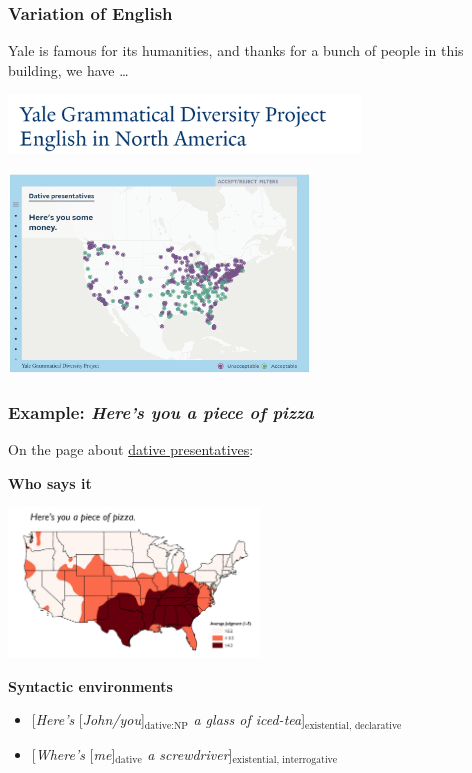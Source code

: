 \documentclass{beamer}
\newcommand{\corpus}[1]{\emph{#1}}
\begin{document}
\begin{frame}
\frametitle{Variation of English}

Yale is famous for its humanities,
and thanks for a bunch of people in this building,
we have \dots

\begin{center}
    \includegraphics[width=0.7\textwidth]{pics/yale-grammar-variation-logl.PNG}
\end{center}

\begin{center}
    \includegraphics[width=0.6\textwidth]{pics/yale-grammar-map-1.PNG}
\end{center}

\end{frame}

\begin{frame}
\frametitle{Example: \corpus{Here's you a piece of pizza}}

On the page about \href{https://ygdp.yale.edu/phenomena/dative-presentatives}{dative presentatives}:

\textbf{Who says it}

\begin{center}
    \includegraphics[width=0.5\textwidth]{maps/here-is-you-a-piece-of-pizza.PNG}
\end{center}    

\textbf{Syntactic environments}

\begin{itemize}
    \item {[\corpus{Here's} [\corpus{John/you}]$_{\text{dative:NP}}$ \corpus{a glass of iced-tea}]$_{\text{existential, declarative}}$} 
    \item {[\corpus{Where's} [\corpus{me}]$_{\text{dative}}$ \corpus{a screwdriver}]$_{\text{existential, interrogative}}$}
\end{itemize}

\end{frame}
\end{document}
